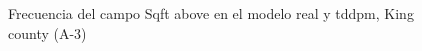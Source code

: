 \begin{figure}[H]
    \centering
    
    \caption{Frecuencia del campo Sqft above en el modelo real y tddpm, King county (A-3)}
    \label{frecuency-tddpm-sqft above}
\end{figure}